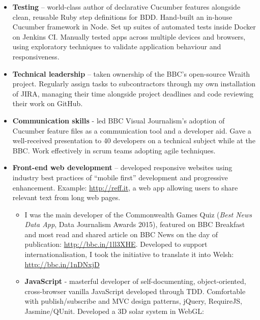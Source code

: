 \documentclass[class=article, crop=false]{standalone}
\begin{document}
\begin{itemize}
    \setlength\itemsep{0.3em}

    \item \textbf{Testing} – world-class author of declarative Cucumber features alongside clean, reusable Ruby step definitions for BDD. Hand-built an in-house Cucumber framework in Node. Set up suites of automated tests inside Docker on Jenkins CI. Manually tested apps across multiple devices and browsers, using exploratory techniques to validate application behaviour and responsiveness.

    \item \textbf{Technical leadership} – taken ownership of the BBC's open-source Wraith project. Regularly assign tasks to subcontractors through my own installation of JIRA, managing their time alongside project deadlines and code reviewing their work on GitHub.

    \item \textbf{Communication skills} - led BBC Visual Journalism's adoption of Cucumber feature files as a communication tool and a developer aid. Gave a well-received presentation to 40 developers on a technical subject while at the BBC. Work effectively in scrum teams adopting agile techniques.

    \item \textbf{Front-end web development} – developed responsive websites using industry best practices of ``mobile first'' development and progressive enhancement. Example: \url{http://reff.it}, a web app allowing users to share relevant text from long web pages.

    \begin{itemize}
        \setlength\itemsep{0.3em}

        \item I was the main developer of the Commonwealth Games Quiz (\emph{Best News Data App}, Data Journalism Awards 2015), featured on BBC Breakfast and most read and shared article on BBC News on the day of publication: \url{http://bbc.in/1ll3XHE}. Developed to support internationalisation, I took the initiative to translate it into Welsh: \url{http://bbc.in/1nDNxjD}

        \item \textbf{JavaScript} - masterful developer of self-documenting, object-oriented, cross-browser vanilla JavaScript developed through TDD. Comfortable with publish/subscribe and MVC design patterns, jQuery, RequireJS, Jasmine/QUnit. Developed a 3D solar system in WebGL:


\end{itemize}
\end{itemize}
\end{document}
